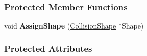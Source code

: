 \subsubsection*{Protected Member Functions}
\begin{DoxyCompactItemize}
\item 
\hypertarget{classphys_1_1ActorBasePhysicsSettings_ad6d8c9507caab541c7e5034b9488d36e}{
void {\bfseries AssignShape} (\hyperlink{classphys_1_1CollisionShape}{CollisionShape} $\ast$Shape)}
\label{classphys_1_1ActorBasePhysicsSettings_ad6d8c9507caab541c7e5034b9488d36e}

\end{DoxyCompactItemize}
\subsubsection*{Protected Attributes}
